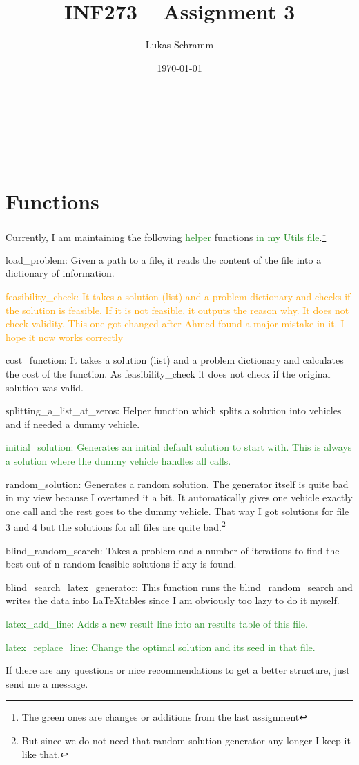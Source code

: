 \documentclass[a4paper,11pt]{article}
\makeatletter
\newcommand{\linia}{\rule{\linewidth}{0.5pt}}
\theoremstyle{mytheor}
\renewcommand{\maketitle}{
\begin{center}
\vspace{2ex}
{\huge \textsc{\@title}}
\vspace{1ex}
\\
\linia\\
\@author \hfill \@date
\vspace{4ex}
\end{center}
}
\makeatother
\begin{document}
\title{INF273 – Assignment 3}

\author{Lukas Schramm}

\date{\today}

\maketitle

\section{Functions}
Currently, I am maintaining the following \textcolor{ForestGreen}{helper} functions \textcolor{ForestGreen}{in my Utils file}.\footnote{The green ones are changes or additions from the last assignment}
\begin{itemize}
\item load\_problem: Given a path to a file, it reads the content of the file into a dictionary of information.
\item \textcolor{Orange}{feasibility\_check: It takes a solution (list) and a problem dictionary and checks if the solution is feasible. If it is not feasible, it outputs the reason why. It does not check validity. This one got changed after Ahmed found a major mistake in it. I hope it now works correctly}
\item cost\_function: It takes a solution (list) and a problem dictionary and calculates the cost of the function. As feasibility\_check it does not check if the original solution was valid.
\item splitting\_a\_list\_at\_zeros: Helper function which splits a solution into vehicles and if needed a dummy vehicle.
\textcolor{ForestGreen}{\item initial\_solution: Generates an initial default solution to start with. This is always a solution where the dummy vehicle handles all calls.}
\item random\_solution: Generates a random solution. The generator itself is quite bad in my view because I overtuned it a bit. It automatically gives one vehicle exactly one call and the rest goes to the dummy vehicle. That way I got solutions for file 3 and 4 but the solutions for all files are quite bad.\footnote{But since we do not need that random solution generator any longer I keep it like that.}
\item blind\_random\_search: Takes a problem and a number of iterations to find the best out of n random feasible solutions if any is found.
\item blind\_search\_latex\_generator: This function runs the blind\_random\_search and writes the data into \LaTeX tables since I am obviously too lazy to do it myself.
\item \textcolor{ForestGreen}{latex\_add\_line: Adds a new result line into an results table of this file.}
\item \textcolor{ForestGreen}{latex\_replace\_line: Change the optimal solution and its seed in that file.}

If there are any questions or nice recommendations to get a better structure, just send me a message.
\end{itemize}
\end{document}
